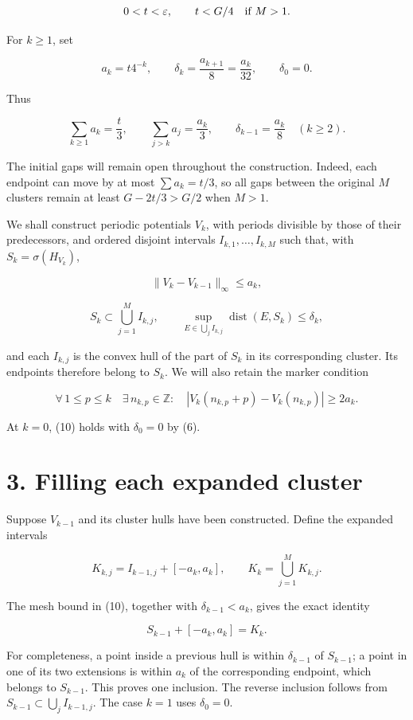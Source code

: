 \documentclass[11pt,a4paper]{article}
\begin{document}
\[
0<t<\varepsilon,
\qquad
 t<G/4\quad\hbox{if }M>1.
\]

For \(k\geq1\), set

\[
a_k=t4^{-k},
\qquad
\delta_k=\frac{a_{k+1}}8=\frac{a_k}{32},
\qquad
\delta_0=0.
\tag{7}
\]

Thus

\[
\sum_{k\geq1}a_k=\frac t3,
\qquad
\sum_{j>k}a_j=\frac{a_k}{3},
\qquad
\delta_{k-1}=\frac{a_k}{8}\quad(k\geq2).
\tag{8}
\]

The initial gaps will remain open throughout the construction. Indeed,
each endpoint can move by at most \(\sum a_k=t/3\), so all gaps between
the original \(M\) clusters remain at least \(G-2t/3>G/2\) when \(M>1\).

We shall construct periodic potentials \(V_k\), with periods divisible
by those of their predecessors, and ordered disjoint intervals
\(I_{k,1},\ldots,I_{k,M}\) such that, with \(S_k=\sigma(H_{V_k})\),

\[
\|V_k-V_{k-1}\|_\infty\leq a_k,
\tag{9}
\]

\[
S_k\subset\bigcup_{j=1}^{M}I_{k,j},
\qquad
\sup_{E\in\bigcup_jI_{k,j}}\operatorname{dist}(E,S_k)\leq\delta_k,
\tag{10}
\]

and each \(I_{k,j}\) is the convex hull of the part of \(S_k\) in its
corresponding cluster. Its endpoints therefore belong to \(S_k\). We
will also retain the marker condition

\[
\forall\,1\leq p\leq k\quad
\exists\,n_{k,p}\in\mathbb Z:\quad
|V_k(n_{k,p}+p)-V_k(n_{k,p})|\geq2a_k.
\tag{11}
\]

At \(k=0\), (10) holds with \(\delta_0=0\) by (6).

\hypertarget{1031-filling-each-expanded-cluster}{%
\section{3. Filling each expanded
cluster}\label{1031-filling-each-expanded-cluster}}

Suppose \(V_{k-1}\) and its cluster hulls have been constructed. Define
the expanded intervals

\[
K_{k,j}=I_{k-1,j}+[-a_k,a_k],
\qquad
K_k=\bigcup_{j=1}^{M}K_{k,j}.
\tag{12}
\]

The mesh bound in (10), together with \(\delta_{k-1}<a_k\), gives the
exact identity

\[
S_{k-1}+[-a_k,a_k]=K_k.
\tag{13}
\]

For completeness, a point inside a previous hull is within
\(\delta_{k-1}\) of \(S_{k-1}\); a point in one of its two extensions is
within \(a_k\) of the corresponding endpoint, which belongs to
\(S_{k-1}\). This proves one inclusion. The reverse inclusion follows
from \(S_{k-1}\subset\bigcup_j I_{k-1,j}\). The case \(k=1\) uses
\(\delta_0=0\).
\end{document}
